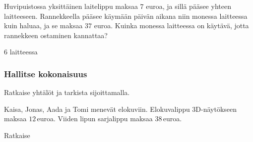 \begin{tehtavasivu}
\begin{tehtava}
Huvipuistossa yksittäinen laitelippu maksaa $7$ euroa, ja sillä pääsee yhteen laitteeseen. Rannekkeella pääsee käymään päivän aikana niin monessa laitteessa kuin haluaa, ja se maksaa $37$ euroa. Kuinka monessa laitteessa on käytävä, jotta rannekkeen ostaminen kannattaa?
	\begin{vastaus}
$6$ laitteessa
	\end{vastaus}
\end{tehtava}

\subsubsection*{Hallitse kokonaisuus}

\begin{tehtava}
Ratkaise yhtälöt ja tarkista sijoittamalla.
	\begin{vastaus}
	\end{vastaus}
\end{tehtava}

\begin{tehtava}
Kaisa, Jonas, Aada ja Tomi menevät elokuviin. Elokuvalippu 3D-näytökseen maksaa $12$\,euroa. Viiden lipun sarjalippu maksaa $38$\,euroa.
	\begin{vastaus}
	\end{vastaus}
\end{tehtava}

\begin{tehtava}
Ratkaise
	\begin{vastaus}
	\end{vastaus}
\end{tehtava}


\end{tehtavasivu}

